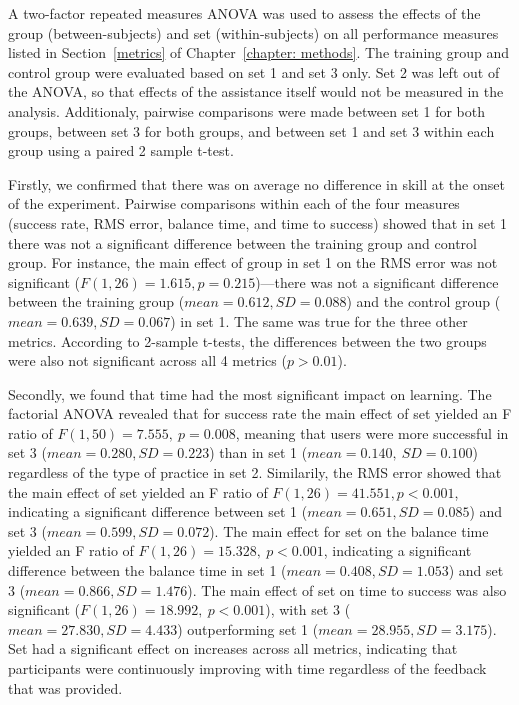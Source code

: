 A two-factor repeated measures ANOVA was used to assess the effects of the group (between-subjects) and set (within-subjects) on all performance measures listed in Section~\ref{metrics} of Chapter~\ref{chapter: methods}. The training group and control group were evaluated based on set 1 and set 3 only. Set 2 was left out of the ANOVA, so that effects of the assistance itself would not be measured in the analysis. Additionaly, pairwise comparisons were made between set 1 for both groups, between set 3 for both groups, and between set 1 and set 3 within each group using a paired 2 sample t-test. 

Firstly, we confirmed that there was on average no difference in skill at the onset of the experiment. Pairwise comparisons within each of the four measures (success rate, RMS error, balance time, and time to success) showed that in set 1 there was not a significant difference between the training group and control group. For instance, the main effect of group in set 1 on the RMS error was not significant ($F(1,26)=1.615, p = 0.215$)---there was not a significant difference between the training group ($mean =0.612, SD =0.088$) and the control group ($mean = 0.639 , SD=0.067$) in set 1. The same was true for the three other metrics. According to 2-sample t-tests, the differences between the two groups were also not significant across all 4 metrics ($p>0.01$).

Secondly, we found that time had the most significant impact on learning. The factorial ANOVA revealed that for success rate the main effect of set yielded an F ratio of $F(1,50)=7.555,\ p=0.008$, meaning that users were more successful in set 3 ($mean =0.280 , SD = 0.223$) than in set 1 ($mean = 0.140,\ SD = 0.100$) regardless of the type of practice in set 2. Similarily, the RMS error showed that the main effect of set yielded an F ratio of $F(1,26) = 41.551, p<0.001$, indicating a significant difference between set 1 ($mean =0.651, SD =0.085$) and set 3 ($mean =0.599, SD =0.072$). The main effect for set on the balance time yielded an F ratio of $F(1,26)=15.328,\ p<0.001$, indicating a significant difference between the balance time in set 1 ($mean = 0.408, SD = 1.053$) and set 3 ($mean = 0.866, SD = 1.476$). The main effect of set on time to success was also significant ($F(1,26)=18.992,\ p<0.001$), with set 3 ($mean = 27.830, SD = 4.433$) outperforming set 1 ($mean = 28.955,SD =3.175$). Set had a significant effect on increases across all metrics, indicating that participants were continuously improving with time regardless of the feedback that was provided. 

